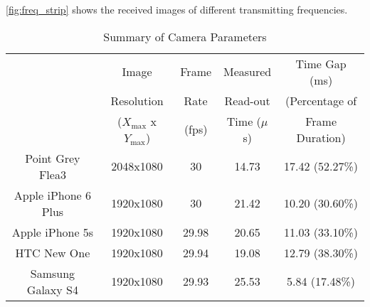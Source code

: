 \autoref{fig:freq_strip} shows the received images of different transmitting frequencies.

\begin{table}[!t]
\hspace{-20em}
\small
\centering
\caption{Summary of Camera Parameters}
   \tabcolsep=0.05cm
    \begin{tabular}{|c|c|c|c|c|}
    \hline

    & Image           & Frame  & Measured    &  Time Gap (ms)    \\
    & Resolution                & Rate   & Read-out    &  (Percentage of   \\ 
    & ($X_{\max}$ x $Y_{\max}$) & (fps)  & Time ($\mu$s) &  Frame Duration)  \\  
    \hline \hline

    Point Grey Flea3 & 2048x1080          & 30         & 14.73             & 17.42 (52.27\%) \\ \hline

    Apple iPhone 6 Plus  & 1920x1080      & 30      & 21.42                   & 10.20 (30.60\%) \\ \hline

    Apple iPhone 5s  & 1920x1080          & 29.98      & 20.65                   & 11.03 (33.10\%) \\ \hline
    
    HTC New One      & 1920x1080          & 29.94         & 19.08              & 12.79 (38.30\%) \\ \hline
    Samsung Galaxy S4  & 1920x1080          & 29.93         & 25.53           & 5.84 (17.48\%) \\ \hline

    \end{tabular}
    \label{tab:readout}
\end{table}
